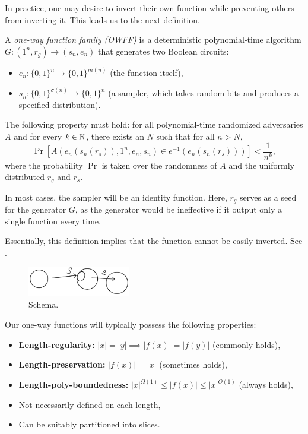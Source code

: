In practice, one may desire to invert their own function while preventing others from inverting it.
This leads us to the next definition.

\begin{definition}
    A \emph{one-way function family (OWFF)} is a deterministic polynomial-time algorithm $G \colon (1^n, r_g) \to (s_n, e_n)$ that generates two Boolean circuits:
    \begin{itemize}
        \item $e_n \colon \{0, 1\}^n \to \{0, 1\}^{m(n)}$ (the function itself),
        \item $s_n \colon \{0, 1\}^{\sigma(n)} \to \{0, 1\}^n$ (a sampler, which takes random bits and produces a specified distribution).
    \end{itemize}
    The following property must hold: for all polynomial-time randomized adversaries $A$ and for every $k \in \mathbb{N}$, there exists an $N$ such that for all $n > N$,
    \[
        \Pr[A(e_n(s_n(r_s)), 1^n, e_n, s_n) \in e^{-1}(e_n(s_n(r_s)))] < \frac{1}{n^k},
    \]
    where the probability $\Pr$ is taken over the randomness of $A$ and the uniformly distributed $r_g$ and $r_s$.
\end{definition}

In most cases, the sampler will be an identity function.
Here, $r_g$ serves as a seed for the generator $G$, as the generator would be ineffective if it output only a single function every time.

Essentially, this definition implies that the function cannot be easily inverted.
See .

\begin{figure}[H]
    \centering
    \includegraphics[width=0.4\textwidth]{figures/2FC91310-FBF1-4D04-ABDB-24F1FDF8893A}
    \caption{Schema.}
    \label{fig:2fc91310-fbf1-4d04-abdb-24f1fdf8893a}
\end{figure}

Our one-way functions will typically possess the following properties:
\begin{itemize}
    \item \textbf{Length-regularity:} $|x| = |y| \implies |f(x)| = |f(y)|$ (commonly holds),
    \item \textbf{Length-preservation:} $|f(x)| = |x|$ (sometimes holds),
    \item \textbf{Length-poly-boundedness:} $|x|^{\Omega(1)} \leq |f(x)| \leq |x|^{O(1)}$ (always holds),
    \item Not necessarily defined on each length,
    \item Can be suitably partitioned into slices.
\end{itemize}

